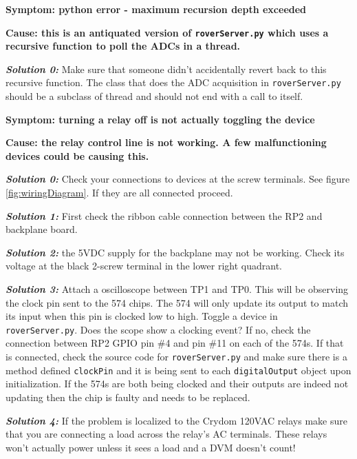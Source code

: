 \documentclass{article}
\begin{document}
\noindent
\textbf{Symptom: python error - maximum recursion depth exceeded}

\noindent
\textbf{Cause: this is an antiquated version of \texttt{roverServer.py} which uses a recursive function to poll the ADCs in a thread.}

\noindent
\textbf{\emph{Solution 0:}} Make sure that someone didn't accidentally revert back to this recursive function. The class that does the ADC acquisition in \texttt{roverServer.py} should be a subclass of thread and should not end with a call to itself.
\newline
\newline



\noindent
\textbf{Symptom: turning a relay off is not actually toggling the device}

\noindent
\textbf{Cause: the relay control line is not working. A few malfunctioning devices could be causing this.}

\noindent
\textbf{\emph{Solution 0:}} Check your connections to devices at the screw terminals. See figure \ref{fig:wiringDiagram}. If they are all connected proceed.

\noindent
\textbf{\emph{Solution 1:}} First check the ribbon cable connection between the RP2 and backplane board.

\noindent
\textbf{\emph{Solution 2:}} the 5VDC supply for the backplane may not be working. Check its voltage at the black 2-screw terminal in the lower right quadrant.

\noindent
\textbf{\emph{Solution 3:}} Attach a oscilloscope between TP1 and TP0. This will be observing the clock pin sent to the 574 chips. The 574 will only update its output to match its input when this pin is clocked low to high. Toggle a device in \texttt{roverServer.py}. Does the scope show a clocking event? If no, check the connection between RP2 GPIO pin \#4 and pin \#11 on each of the 574s. If that is connected, check the source code for \texttt{roverServer.py} and make sure there is a method defined \texttt{clockPin} and it is being sent to each \texttt{digitalOutput} object upon initialization. If the 574s are both being clocked and their outputs are indeed not updating then the chip is faulty and needs to be replaced.

\noindent
\textbf{\emph{Solution 4:}} If the problem is localized to the Crydom 120VAC relays make sure that you are connecting a load across the relay's AC terminals. These relays won't actually power unless it sees a load and a DVM doesn't count!
\end{document}
